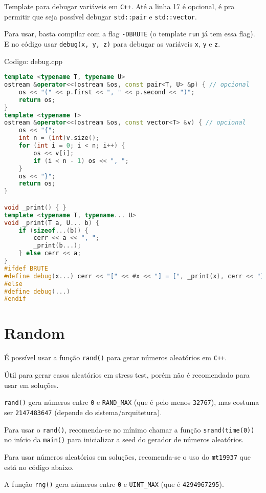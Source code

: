 \documentclass[10pt, a4paper, oneside]{book}
\begin{document}
Template para debugar variáveis em \texttt{C++}. Até a linha 17 é opcional, é pra permitir que seja possível debugar \texttt{std::pair} e \texttt{std::vector}.

Para usar, basta compilar com a flag \texttt{-DBRUTE} (o template \texttt{run} já tem essa flag). E no código usar \texttt{debug(x, y, z)} para debugar as variáveis \texttt{x}, \texttt{y} e \texttt{z}.
\hfill

Codigo: debug.cpp

\begin{lstlisting}[language=C++]
template <typename T, typename U>
ostream &operator<<(ostream &os, const pair<T, U> &p) { // opcional
    os << "(" << p.first << ", " << p.second << ")";
    return os;
}
template <typename T>
ostream &operator<<(ostream &os, const vector<T> &v) { // opcional
    os << "{";
    int n = (int)v.size();
    for (int i = 0; i < n; i++) {
        os << v[i];
        if (i < n - 1) os << ", ";
    }
    os << "}";
    return os;
}

void _print() { }
template <typename T, typename... U>
void _print(T a, U... b) {
    if (sizeof...(b)) {
        cerr << a << ", ";
        _print(b...);
    } else cerr << a;
}
#ifdef BRUTE
#define debug(x...) cerr << "[" << #x << "] = [", _print(x), cerr << "]" << endl
#else
#define debug(...)
#endif\end{lstlisting}
\hfill

\section{Random}


É possível usar a função \texttt{rand()} para gerar números aleatórios em \texttt{C++}.

Útil para gerar casos aleatórios em stress test, porém não é recomendado para usar em soluções.

\texttt{rand()} gera números entre \texttt{0} e \texttt{RAND\_MAX} (que é pelo menos \texttt{32767}), mas costuma ser \texttt{2147483647} (depende do sistema/arquitetura).

Para usar o \texttt{rand()}, recomenda-se no mínimo chamar a função \texttt{srand(time(0))} no início da \texttt{main()} para inicializar a seed do gerador de números aleatórios.



Para usar números aleatórios em soluções, recomenda-se o uso do \texttt{mt19937} que está no código abaixo.

A função \texttt{rng()} gera números entre \texttt{0} e \texttt{UINT\_MAX} (que é \texttt{4294967295}).
\end{document}
